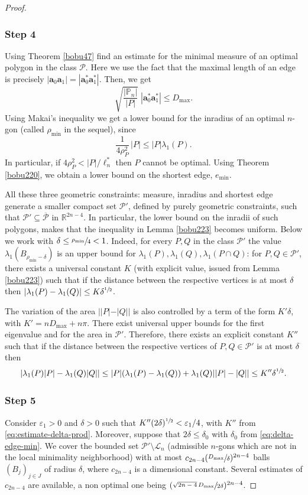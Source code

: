 \documentclass[JEP,XML,SOM,Unicode,ThmDefs,NoFloatCountersInSection,published]{cedram}
\theoremstyle{plain}
\theoremstyle{definition}
\newcommand{\bo}[1]{{\boldsymbol#1}}
\let\Bbb\mathbb
\def\R{\mathbb{R}}
\newcommand{\lb}{\lambda}
\newcommand{\sq}{\subseteq}
\begin{document}
\begin{proof}
\subsubsection*{Step 4} Using Theorem \ref{bobu47} find an estimate for the minimal measure of an optimal polygon in the class $\mathcal P$. Here we use the fact that the maximal length of an edge is precisely $| \bo a_0\bo a_1 | = |\bo a^*_0\bo a^*_1|$. Then, we get
\[
\sqrt{\frac{|\Bbb P_n|}{|P|}}\;
|\bo a_0^* \bo a_1^*|\le D_{\max}.
\]
Using Makai's inequality we get a lower bound for the inradius of an optimal $n$-gon (called $\rho_{\min}$ in the sequel), since
\[
\frac{1}{4\rho_P^2}\,|P|\le |P|\lb_1(P).
\]
In particular, {if $4\rho_P^2 < |P|/\ell_n^*$ then $P$ cannot be optimal.}
Using Theorem \ref{bobu220}, we obtain a lower bound on the shortest edge, $e_{\min}$.

All these three geometric constraints: measure, inradius and shortest edge generate a smaller compact set $\mathcal P' $, defined by purely geometric constraints, such that $\mathcal P' \sq \overline {\mathcal P}$ in $\R^{2n-4}$. In particular, the lower bound on the inradii of such polygons, makes that the inequality in Lemma \ref{bobu223} becomes uniform. Below we work with $\delta \le \sfrac{\rho_{\min}}{4}<1$. Indeed, for every $P, Q$ in the class $\mathcal P' $ the value $ \lb_1(B_{\rho_{\min}- \delta})$ is an upper bound for
$\lb_1(P), \lb_1(Q), \lb_1(P\cap Q)$: for $P,Q \in \mathcal P'$, there exists a universal constant $K$ (with explicit value, issued from Lemma \ref{bobu223}) such that if the distance between the respective vertices is at most $\delta$ then $|\lambda_1(P)-\lambda_1(Q)|\leq K\delta^{\sfrac 12}$.

The variation of the area $||P|-|Q||$ is also controlled by a term of the form $K'\delta $, with $K'= nD_{\max}+ n\pi$. There exist universal upper bounds for the first eigenvalue and for the area in $\mathcal P'$. Therefore, there exists an explicit constant $K''$ such that if the distance between the respective vertices of $P, Q\in \mathcal P'$ is at most $\delta$ then
\begin{equation}
|\lambda_1(P)|P|-\lambda_1(Q)|Q||\leq
|P|(\lambda_1(P)-\lambda_1(Q))+\lambda_1(Q)||P|-|Q|| \leq K''\delta^{\sfrac 12}.
\label{eq:estimate-delta-prod}
\end{equation}

\subsubsection*{Step 5}
Consider $\varepsilon_1>0$ and $\delta>0$ such that $K''(2\delta)^{\sfrac 12}<\varepsilon_1/4$, with $K''$ from \eqref{eq:estimate-delta-prod}. Moreover, suppose that $2\delta\leq \delta_0$ with $\delta_0$ from \eqref{eq:delta-edge-min}. We cover the bounded set $\mathcal P'\setminus \mathcal L_n$ (admissible $n$-gons which are not in the local minimality neighborhood) with at most $c_{2n-4}(\sfrac{D_{\max}}{\delta})^{2n-4}$ balls $(B_j)_{j \in J}$ of radius $\delta$, where $c_{2n-4}$ is a dimensional constant. Several estimates of $c_{2n-4}$ are available, a non optimal one being $(\sfrac{\sqrt{2n-4}\,D_{\max}}{2 \delta})^{2n-4}$.


\end{proof}
\end{document}

